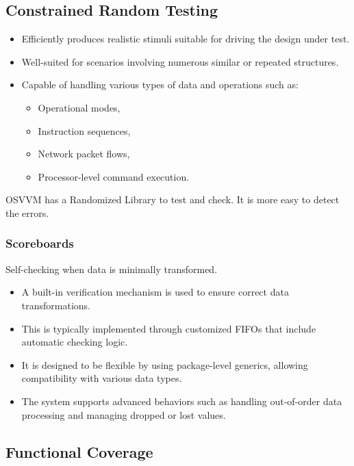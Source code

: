 \documentclass{article}
\begin{document}
\subsection{Constrained Random Testing}

\begin{itemize}
  \item Efficiently produces realistic stimuli suitable for driving the design under test.
  \item Well-suited for scenarios involving numerous similar or repeated structures.
  \item Capable of handling various types of data and operations such as:
  \begin{itemize}
    \item Operational modes,
    \item Instruction sequences,
    \item Network packet flows,
    \item Processor-level command execution.
  \end{itemize}
\end{itemize}

OSVVM has a Randomized Library to test and check. It is more easy to detect the errors.

\subsubsection{Scoreboards}
Self-checking when data is minimally transformed.

\begin{itemize}
  \item A built-in verification mechanism is used to ensure correct data transformations.
  \item This is typically implemented through customized FIFOs that include automatic checking logic.
  \item It is designed to be flexible by using package-level generics, allowing compatibility with various data types.
  \item The system supports advanced behaviors such as handling out-of-order data processing and managing dropped or lost values.
\end{itemize}

\subsection{Functional Coverage}
\end{document}
